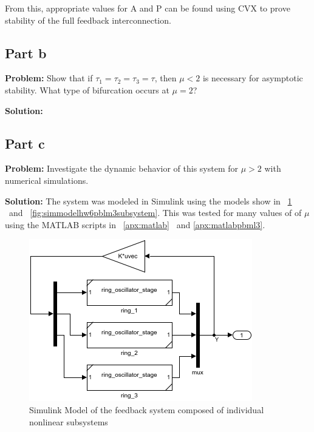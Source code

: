 \documentclass[letter]{article}
\begin{document}
From this, appropriate values for A and P can be found using CVX to prove stability of the full feedback interconnection.





\newpage
\subsection{Part b}
\textbf{Problem:}
Show that if $\tau_1 = \tau_2 = \tau_3 = \tau$, then $\mu <2$ is necessary for asymptotic stability. What type of bifurcation occurs at $\mu = 2$?

\textbf{Solution:}













\newpage
\subsection{Part c}
\textbf{Problem:}
Investigate the dynamic behavior of this system for $\mu > 2$ with numerical simulations.

\noindent
\textbf{Solution:}
The system was modeled in Simulink using the models show in \figurename \ \ref{fig:simmodelhw6pblm3} \ and \figurename \ \ref{fig:simmodelhw6pblm3subsystem}. This was tested for many values of of $\mu$ using the MATLAB scripts in \appendixname \ \ref{apx:matlab} \ and \ref{apx:matlabpbml3}.

\begin{figure}[h]
	\centering
	\includegraphics[width=0.7\linewidth]{fig/sim_model_HW6_pblm3}
	\caption{Simulink Model of the feedback system composed of individual nonlinear subsystems}
	\label{fig:simmodelhw6pblm3}
\end{figure}
\end{document}
